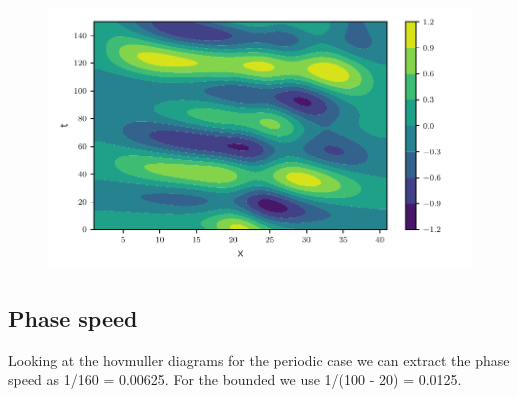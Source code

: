 \begin{figure}[htp]
  \centering
  \includegraphics[width=\textwidth]{../figures/psi_bounded_centered_gauss.pdf}
  \caption{}
  \label{fig:bounded_gauss}
\end{figure}


\subsection{Phase speed}


Looking at the hovmuller diagrams for the periodic case we
can extract the phase speed as 1/160 = 0.00625.
For the bounded we use 1/(100 - 20) = 0.0125.
